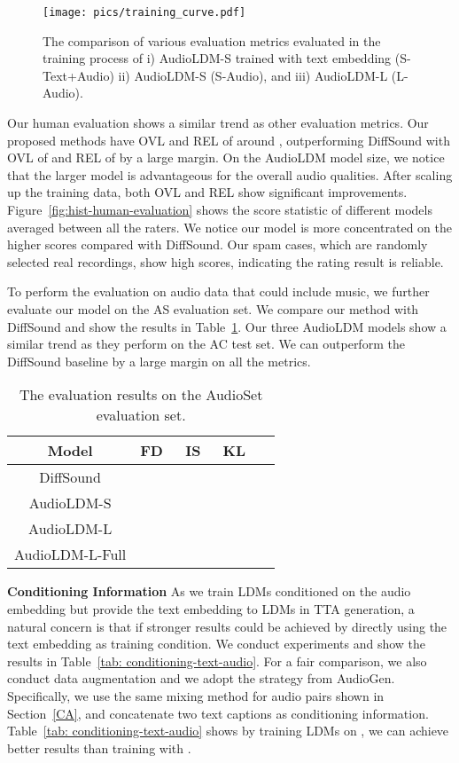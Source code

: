 \documentclass{article}
\begin{document}
\begin{figure}[tbp]
    \centering
    \texttt{[image: pics/training\_curve.pdf]}
    \caption{The comparison of various evaluation metrics evaluated in the training process of i) AudioLDM-S trained with text embedding (S-Text+Audio) ii) AudioLDM-S (S-Audio), and iii) AudioLDM-L (L-Audio).}
    \label{fig:training-steps-fd-is-kl}
\end{figure}

Our human evaluation shows a similar trend as other evaluation metrics. Our proposed methods have OVL and REL of around , outperforming DiffSound with OVL of  and REL of  by a large margin. On the AudioLDM model size, we notice that the larger model is advantageous for the overall audio qualities. After scaling up the training data, both OVL and REL show significant improvements.
Figure~\ref{fig:hist-human-evaluation} shows the score statistic of different models averaged between all the raters. We notice our model is more concentrated on the higher scores compared with DiffSound. Our spam cases, which are randomly selected real recordings, show high scores, indicating the rating result is reliable.



To perform the evaluation on audio data that could include music, we further evaluate our model on the AS evaluation set. We compare our method with DiffSound and show the results in Table~\ref{tab: AudioSetResults}. Our three AudioLDM models show a similar trend as they perform on the AC test set. We can outperform the DiffSound baseline by a large margin on all the metrics. 

\begin{table}[htbp]
\small
\centering
\begin{tabular}{ccccc}
\toprule
       Model            & FD~   & IS~   & KL~  \\
\midrule
DiffSound          &  &   &  \\
AudioLDM-S      &  &  &   \\
AudioLDM-L      &  &  &  \\
AudioLDM-L-Full &  &  &  \\
\bottomrule
\end{tabular}
\caption{The evaluation results on the AudioSet evaluation set.}
\label{tab: AudioSetResults}
\end{table}



\textbf{Conditioning Information}
As we train LDMs conditioned on the audio embedding  but provide the text embedding  to LDMs in TTA generation, a natural concern is that if stronger results could be achieved by directly using the text embedding as training condition. We conduct experiments and show the results in Table~\ref{tab: conditioning-text-audio}. For a fair comparison, we also conduct data augmentation and we adopt the strategy from AudioGen. Specifically, we use the same mixing method for audio pairs shown in Section~\ref{CA}, and concatenate two text captions as conditioning information. Table~\ref{tab: conditioning-text-audio} shows by training LDMs on , we can achieve better results than training with . 
\end{document}
